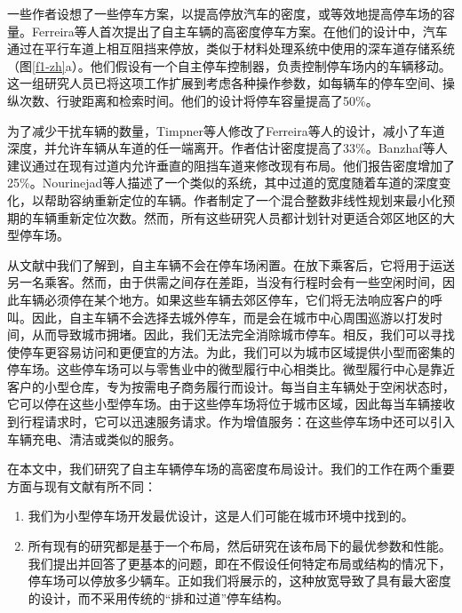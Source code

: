 一些作者设想了一些停车方案，以提高停放汽车的密度，或等效地提高停车场的容量。Ferreira等人首次提出了自主车辆的高密度停车方案。在他们的设计中，汽车通过在平行车道上相互阻挡来停放，类似于材料处理系统中使用的深车道存储系统（图\ref{f1-zh}a）。他们假设有一个自主停车控制器，负责控制停车场内的车辆移动。这一组研究人员已将这项工作扩展到考虑各种操作参数，如每辆车的停车空间、操纵次数、行驶距离和检索时间。他们的设计将停车容量提高了50\%。

为了减少干扰车辆的数量，Timpner等人修改了Ferreira等人的设计，减小了车道深度，并允许车辆从车道的任一端离开。作者估计密度提高了33\%。Banzhaf等人建议通过在现有过道内允许垂直的阻挡车道来修改现有布局。他们报告密度增加了25\%。Nourinejad等人描述了一个类似的系统，其中过道的宽度随着车道的深度变化，以帮助容纳重新定位的车辆。作者制定了一个混合整数非线性规划来最小化预期的车辆重新定位次数。然而，所有这些研究人员都计划针对更适合郊区地区的大型停车场。

从文献中我们了解到，自主车辆不会在停车场闲置。在放下乘客后，它将用于运送另一名乘客。然而，由于供需之间存在差距，当没有行程时会有一些空闲时间，因此车辆必须停在某个地方。如果这些车辆去郊区停车，它们将无法响应客户的呼叫。因此，自主车辆不会选择去城外停车，而是会在城市中心周围巡游以打发时间，从而导致城市拥堵。因此，我们无法完全消除城市停车。相反，我们可以寻找使停车更容易访问和更便宜的方法。为此，我们可以为城市区域提供小型而密集的停车场。这些停车场可以与零售业中的微型履行中心相类比。微型履行中心是靠近客户的小型仓库，专为按需电子商务履行而设计。每当自主车辆处于空闲状态时，它可以停在这些小型停车场。由于这些停车场将位于城市区域，因此每当车辆接收到行程请求时，它可以迅速服务请求。作为增值服务：在这些停车场中还可以引入车辆充电、清洁或类似的服务。

在本文中，我们研究了自主车辆停车场的高密度布局设计。我们的工作在两个重要方面与现有文献有所不同：

\begin{enumerate}
    \item 我们为小型停车场开发最优设计，这是人们可能在城市环境中找到的。
    \item 所有现有的研究都是基于一个布局，然后研究在该布局下的最优参数和性能。我们提出并回答了更基本的问题，即在不假设任何特定布局或结构的情况下，停车场可以停放多少辆车。正如我们将展示的，这种放宽导致了具有最大密度的设计，而不采用传统的“排和过道”停车结构。
\end{enumerate}



